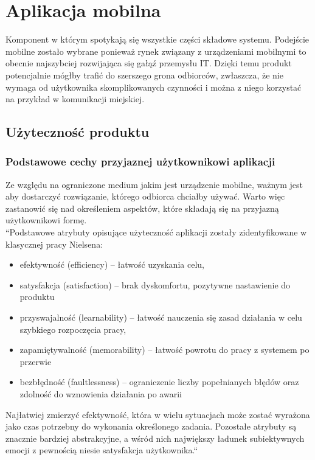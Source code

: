 \section{Aplikacja mobilna}
Komponent w którym spotykają się wszystkie części składowe systemu. Podejście mobilne zostało wybrane ponieważ rynek związany z urządzeniami mobilnymi to obecnie najszybciej rozwijająca się gałąź przemysłu IT\cite{mobile}. Dzięki temu produkt potencjalnie mógłby trafić do szerszego grona odbiorców, zwłaszcza, że nie wymaga od użytkownika skomplikowanych czynności i można z niego korzystać na przykład w komunikacji miejskiej.

\subsection{Użyteczność produktu}
\subsubsection{Podstawowe cechy przyjaznej użytkownikowi aplikacji}
 Ze względu na ograniczone medium jakim jest urządzenie mobilne, ważnym jest aby dostarczyć rozwiązanie, którego odbiorca chciałby używać. Warto więc zastanowić się nad określeniem aspektów, które składają się na przyjazną użytkownikowi formę.\\
 ``Podstawowe atrybuty opisujące użyteczność aplikacji zostały zidentyfikowane w klasycznej pracy Nielsena\cite{usability}: 
 \begin{itemize}
	 \item efektywność (efficiency) – łatwość uzyskania celu,
	 \item satysfakcja (satisfaction) – brak dyskomfortu, pozytywne nastawienie do
	 produktu
	 \item przyswajalność (learnability) – łatwość nauczenia się zasad działania w celu szybkiego rozpoczęcia pracy,
	 \item zapamiętywalność (memorability) – łatwość powrotu do pracy z systemem
	 po przerwie
	 \item bezbłędność (faultlessness) – ograniczenie liczby popełnianych błędów oraz zdolność do wznowienia działania po awarii
 \end{itemize}
 Najłatwiej zmierzyć efektywność, która w wielu sytuacjach może zostać
 wyrażona jako czas potrzebny do wykonania określonego zadania. Pozostałe
 atrybuty są znacznie bardziej abstrakcyjne, a wśród nich największy ładunek
 subiektywnych emocji z pewnością niesie satysfakcja użytkownika.``\cite{mobile}

